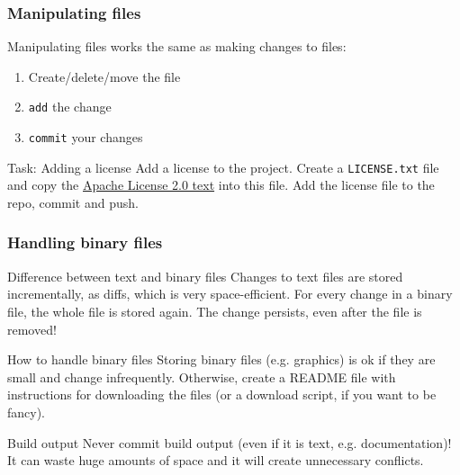 \begin{frame}[fragile]

\frametitle{Manipulating files}
	
Manipulating files works the same as making changes to files:
\begin{enumerate}
	\item Create/delete/move the file
	\item \texttt{add} the change
	\item \texttt{commit} your changes
\end{enumerate}

\begin{block}{Task: Adding a license}
	Add a license to the project. Create a \texttt{LICENSE.txt} file and copy the \href{https://choosealicense.com/licenses/apache-2.0/}{Apache License 2.0 text} into this file. Add the license file to the repo, commit and push.
\end{block}
	
\end{frame}


\begin{frame}[fragile]
	\frametitle{Handling binary files}
	
	\begin{block}{Difference between text and binary files}
	Changes to text files are stored incrementally, as diffs, which is very space-efficient. For every change in a binary file, the whole file is stored again. The change persists, even after the file is removed!
	\end{block}
	
	\begin{block}{How to handle binary files}
	Storing binary files (e.g. graphics) is ok if they are small and change infrequently. Otherwise, create a README file with instructions for downloading the files (or a download script, if you want to be fancy).
	\end{block}
	
	\begin{block}{Build output}
	\alert{Never} commit build output (even if it is text, e.g. documentation)! It can waste \alert{huge} amounts of space and it will create unnecessary conflicts.
	\end{block}
\end{frame}


